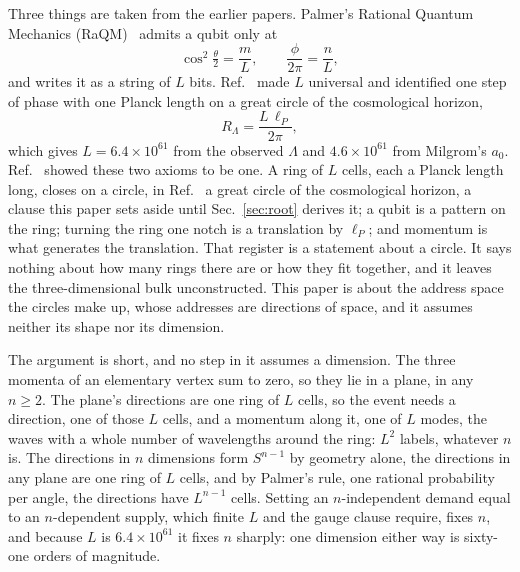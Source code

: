 \documentclass[aps,prd,twocolumn,superscriptaddress,nofootinbib]{revtex4-2}
\begin{document}
Three things are taken from the earlier papers. Palmer's Rational Quantum Mechanics (RaQM)~\cite{palmer2020,palmer2026,palmer2026b,palmer2026c} admits a qubit only at
\begin{equation}
\cos^2\tfrac{\theta}{2} = \frac{m}{L},\qquad \frac{\phi}{2\pi} = \frac{n}{L},
\label{eq:raqm}
\end{equation}
and writes it as a string of $L$ bits. Ref.~\cite{korytko2026} made $L$ universal and identified one step of phase with one Planck length on a great circle of the cosmological horizon,
\begin{equation}
R_\Lambda = \frac{L\,\ell_P}{2\pi},
\label{eq:ident}
\end{equation}
which gives $L = 6.4\times10^{61}$ from the observed $\Lambda$ and $4.6\times10^{61}$ from Milgrom's $a_0$. Ref.~\cite{korytko2026c} showed these two axioms to be one. A ring of $L$ cells, each a Planck length long, closes on a circle, in Ref.~\cite{korytko2026c} a great circle of the cosmological horizon, a clause this paper sets aside until Sec.~\ref{sec:root} derives it; a qubit is a pattern on the ring; turning the ring one notch is a translation by $\ell_P$; and momentum is what generates the translation. That register is a statement about a circle. It says nothing about how many rings there are or how they fit together, and it leaves the three-dimensional bulk unconstructed. This paper is about the address space the circles make up, whose addresses are directions of space, and it assumes neither its shape nor its dimension.

The argument is short, and no step in it assumes a dimension. The three momenta of an elementary vertex sum to zero, so they lie in a plane, in any $n \ge 2$. The plane's directions are one ring of $L$ cells, so the event needs a direction, one of those $L$ cells, and a momentum along it, one of $L$ modes, the waves with a whole number of wavelengths around the ring: $L^2$ labels, whatever $n$ is. The directions in $n$ dimensions form $S^{n-1}$ by geometry alone, the directions in any plane are one ring of $L$ cells, and by Palmer's rule, one rational probability per angle, the directions have $L^{n-1}$ cells. Setting an $n$-independent demand equal to an $n$-dependent supply, which finite $L$ and the gauge clause require, fixes $n$, and because $L$ is $6.4\times10^{61}$ it fixes $n$ sharply: one dimension either way is sixty-one orders of magnitude.
\end{document}
